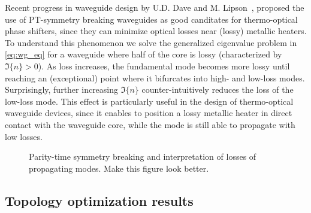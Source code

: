 Recent progress in waveguide design by U.D. Dave and M. Lipson~\cite{lipson}, proposed the use of PT-symmetry breaking waveguides as good canditates for
thermo-optical phase shifters, since they can minimize optical losses near (lossy) metallic heaters. To understand this phenomenon we solve the generalized
eigenvalue problem in \eqref{eq:wg_eq} for a waveguide where half of the core is lossy (characterized by $\Im\{n\}>0$).  As loss increases, the fundamental mode becomes more lossy until reaching an (exceptional) 
point where it bifurcates into high- and low-loss modes. Surprisingly, further increasing $\Im\{n\}$ counter-intuitively reduces the loss of the low-loss mode. This effect is particularly useful in the design of
thermo-optical waveguide devices, since it enables to position a lossy metallic heater in direct contact with the waveguide core, while the mode is still able to propagate with low losses.

\begin{figure}[tb]
    \centering
    \caption{Parity-time symmetry breaking and interpretation of losses of propagating modes. Make this figure look better.}
    \label{fig:thermo_opt}
\end{figure}

\subsection*{Topology optimization results~\cite{ownpub0}}

